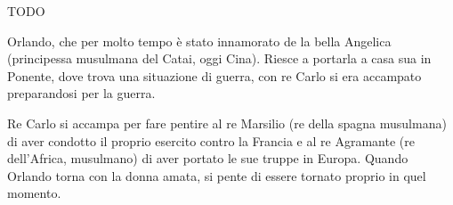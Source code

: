 \documentclass[a4paper]{article}
\begin{document}
TODO

\begin{center} %
\begin{minipage}{0.5\textwidth}
\centering
{}
\end{minipage}
\end{center}

Orlando, che per molto tempo è stato innamorato de la bella Angelica (principessa musulmana del Catai, oggi Cina).
Riesce a portarla a casa sua in Ponente, dove trova una situazione di guerra,
con re Carlo si era accampato preparandosi per la guerra.

\begin{center} %
\begin{minipage}{0.5\textwidth}
\centering
{}
\end{minipage}
\end{center}

Re Carlo si accampa per fare pentire al re Marsilio (re della spagna musulmana)
di aver condotto il proprio esercito contro la Francia e
al re Agramante (re dell'Africa, musulmano)
di aver portato le sue truppe in Europa.
Quando Orlando torna con la donna amata, si pente di essere tornato proprio in quel momento.
\end{document}
